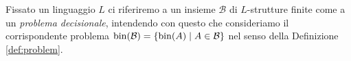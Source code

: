 \begin{definizione}
\label{def:problem-struct}
Fissato un linguaggio $L$ ci riferiremo a un insieme $\mathcal{B}$ di $L$-strutture finite
come a un \emph{problema decisionale}, intendendo con questo che consideriamo il corrispondente
problema $\operatorname{bin}(\mathcal{B}) = \{\operatorname{bin}(A) \mid A \in \mathcal{B}\}$ nel senso della Definizione \ref{def:problem}.
\end{definizione}
